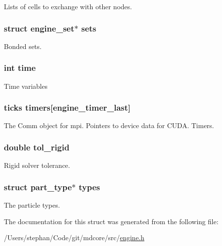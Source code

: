 Lists of cells to exchange with other nodes. \hypertarget{structengine_a5eab4a887e3d36026b70dd4e4e372630}{
\subsubsection[{sets}]{\setlength{\rightskip}{0pt plus 5cm}struct {\bf engine\-\_\-set}$\ast$ sets}}\label{structengine_a5eab4a887e3d36026b70dd4e4e372630}
Bonded sets. \hypertarget{structengine_a42715f65f02da52edc5b22021d8ae670}{
\subsubsection[{time}]{\setlength{\rightskip}{0pt plus 5cm}int time}}\label{structengine_a42715f65f02da52edc5b22021d8ae670}
Time variables \hypertarget{structengine_ab82bc5d54d6f200a605c3aace671671c}{
\subsubsection[{timers}]{\setlength{\rightskip}{0pt plus 5cm}ticks timers\mbox{[}{\bf engine\-\_\-timer\-\_\-last}\mbox{]}}}\label{structengine_ab82bc5d54d6f200a605c3aace671671c}
The Comm object for mpi. Pointers to device data for C\-U\-D\-A. Timers. \hypertarget{structengine_a5d4ff08ea8e350214c1a46663b229500}{
\subsubsection[{tol\-\_\-rigid}]{\setlength{\rightskip}{0pt plus 5cm}double tol\-\_\-rigid}}\label{structengine_a5d4ff08ea8e350214c1a46663b229500}
Rigid solver tolerance. \hypertarget{structengine_a476fc4b80594201e7819214e03a97f11}{
\subsubsection[{types}]{\setlength{\rightskip}{0pt plus 5cm}struct {\bf part\-\_\-type}$\ast$ types}}\label{structengine_a476fc4b80594201e7819214e03a97f11}
The particle types. 

The documentation for this struct was generated from the following file\-:\begin{DoxyCompactItemize}
\item 
/\-Users/stephan/\-Code/git/mdcore/src/\hyperlink{engine_8h}{engine.\-h}\end{DoxyCompactItemize}
